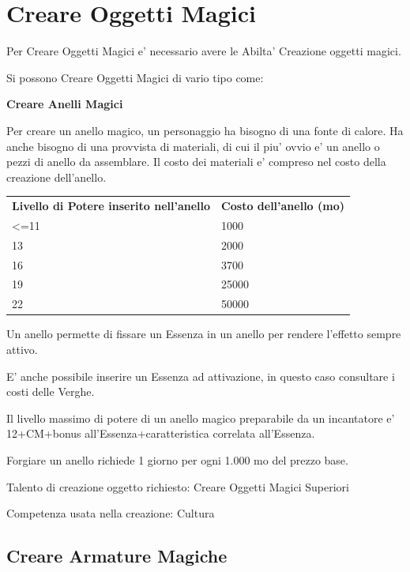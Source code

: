 \documentclass[a4paper,11pt,twoside,openany]{book}
\begin{document}
{		\pagebreak
		
		\section{Creare Oggetti Magici}
		
		\label{creare-oggetti-magici}
		
		Per Creare Oggetti Magici e' necessario avere le Abilta' Creazione oggetti magici.
		
		Si possono Creare Oggetti Magici di vario tipo come:
		
		\bigskip
		
		\textbf{Creare Anelli Magici}
		
		Per creare un anello magico, un personaggio ha bisogno di una fonte di calore. Ha anche bisogno di una provvista di materiali, di cui il piu' ovvio e' un anello o pezzi di anello da assemblare. Il costo dei materiali e' compreso nel costo della creazione dell'anello.
		
		\bigskip
		
		\begin{tabular}{ll}
			\toprule
			\textbf{Livello di Potere inserito nell'anello} & \textbf{Costo dell'anello (mo)}\tabularnewline
			\textless=11 & 1000\tabularnewline
			13 & 2000\tabularnewline
			16 & 3700\tabularnewline
			19 & 25000\tabularnewline
			22 & 50000\tabularnewline
		\end{tabular}
		
		\bigskip
		
		Un anello permette di fissare un Essenza in un anello per rendere l'effetto sempre attivo.
		
		E' anche possibile inserire un Essenza ad attivazione, in questo caso consultare i costi delle Verghe.
		
		Il livello massimo di potere di un anello magico preparabile da un incantatore e' 12+CM+bonus all'Essenza+caratteristica correlata all'Essenza.
		
		Forgiare un anello richiede 1 giorno per ogni 1.000 mo del prezzo base.
		
		Talento di creazione oggetto richiesto: Creare Oggetti Magici Superiori
		
		Competenza usata nella creazione: Cultura
		
		\subsection{Creare Armature Magiche}
		
}
\end{document}
